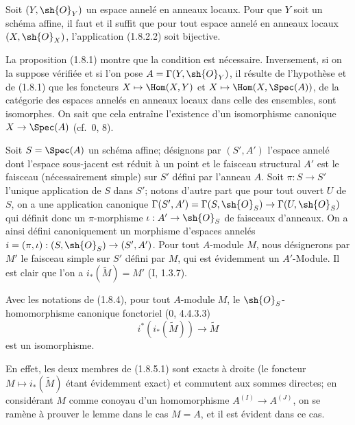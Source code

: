 \begin{corollary}[1.8.3]
\label{ega2:addendum:I.1.8.3-fr}
Soit $(Y,\sh{O}_Y)$ un espace annelé en anneaux locaux. Pour que $Y$
soit un schéma affine, il faut et il suffit que pour tout espace annelé
en anneaux locaux $(X,\sh{O}_X)$, l'application (1.8.2.2) soit
bijective.
\end{corollary}

La proposition (1.8.1) montre que la condition est nécessaire.
Inversement, si on la suppose vérifiée et si l'on pose
$A=\Gamma(Y,\sh{O}_Y)$, il résulte de l'hypothèse et de (1.8.1) que les
foncteurs $X\mapsto\Hom(X,Y)$ et
$X\mapsto\Hom(X,\Spec(A))$, de la catégorie des espaces annelés en
anneaux locaux dans celle des ensembles, sont isomorphes. On sait que
cela entraîne l'existence d'un isomorphisme canonique
$X\to\Spec(A)$ (cf.~0, 8).

\begin{env}[1.8.4]
\label{ega2:addendum:I.1.8.4-fr}
Soit $S=\Spec(A)$ un schéma affine; désignons par $(S',A')$ l'espace
annelé dont l'espace sous-jacent est réduit à un point et le faisceau
structural $A'$ est le faisceau (nécessairement simple) sur $S'$ défini
par l'anneau $A$. Soit $\pi:S\to S'$ l'unique application de $S$ dans
$S'$; notons d'autre part que pour tout ouvert $U$ de $S$, on a une
application canonique
$\Gamma(S',A')=\Gamma(S,\sh{O}_S)\to\Gamma(U,\sh{O}_S)$ qui définit
donc un $\pi$-morphisme $\iota:A'\to\sh{O}_S$ de faisceaux d'anneaux.
On a ainsi défini canoniquement un morphisme d'espaces annelés
$i=(\pi,\iota):(S,\sh{O}_S)\to(S',A')$. Pour tout $A$-module $M$, nous
désignerons par $M'$ le faisceau simple sur $S'$ défini par $M$, qui
est évidemment un $A'$-Module. Il est clair que l'on a
$i_*(\widetilde M)=M'$ (I, 1.3.7).
\end{env}

\begin{lemma}[1.8.5]
\label{ega2:addendum:I.1.8.5-fr}
Avec les notations de (1.8.4), pour tout $A$-module $M$, le
$\sh{O}_S$-homomorphisme canonique fonctoriel (0, 4.4.3.3)
\begin{equation}
\label{ega2:addendum:I.1.8.5.1-fr}
  i^*(i_*(\widetilde M))\to\widetilde M
\tag{1.8.5.1}
\end{equation}
est un isomorphisme.
\end{lemma}

En effet, les deux membres de (1.8.5.1) sont exacts à droite (le
foncteur $M\mapsto i_*(\widetilde M)$ étant évidemment exact) et
commutent aux sommes directes; en considérant $M$ comme conoyau d'un
homomorphisme $A^{(I)}\to A^{(J)}$, on se ramène à prouver le lemme
dans le cas $M=A$, et il est évident dans ce cas.

